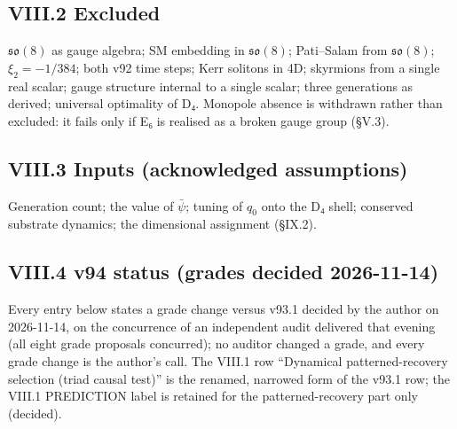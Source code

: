 \documentclass[a4paper,11pt]{article}
\begin{document}
\subsection*{VIII.2 Excluded}

$\mathfrak{so}(8)$ as gauge algebra; SM embedding in $\mathfrak{so}(8)$; Pati–Salam from $\mathfrak{so}(8)$; $\xi_2=-1/384$; both v92 time steps; Kerr solitons in 4D; skyrmions from a single real scalar; gauge structure internal to a single scalar; three generations as derived; universal optimality of D₄. Monopole absence is withdrawn rather than excluded: it fails only if E₆ is realised as a broken gauge group (§V.3).

\subsection*{VIII.3 Inputs (acknowledged assumptions)}

Generation count; the value of $\bar\psi$; tuning of $q_0$ onto the D₄ shell; conserved substrate dynamics; the dimensional assignment (§IX.2).
\subsection*{VIII.4 v94 status (grades decided 2026-11-14)}

Every entry below states a grade change versus v93.1 decided by the author on 2026-11-14, on the concurrence of an independent audit delivered that evening (all eight grade proposals concurred); no auditor changed a grade, and every grade change is the author's call. The VIII.1 row ``Dynamical patterned-recovery selection (triad causal test)'' is the renamed, narrowed form of the v93.1 row; the VIII.1 PREDICTION label is retained for the patterned-recovery part only (decided).
\end{document}
